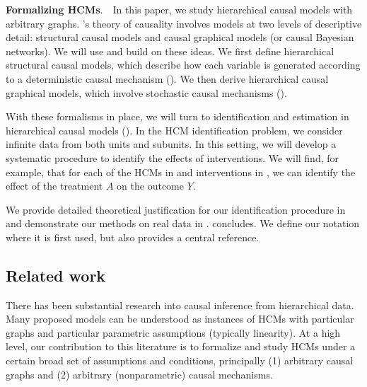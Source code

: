 \documentclass[12pt]{article}
\newcommand{\parhead}[1]{\vspace{0.1in} \noindent \textbf{#1}. \,\,}
\begin{document}
\parhead{Formalizing HCMs} In this paper, we study hierarchical causal models with arbitrary graphs. \citet{Pearl2009-fh}'s theory of causality involves models at two levels of descriptive detail: structural causal models and causal graphical models (or causal Bayesian networks). We will use and build on these ideas.  We first define hierarchical structural causal models, which describe how each variable is generated according to a deterministic causal mechanism (). We then derive hierarchical causal graphical models, which involve stochastic causal mechanisms ().

With these formalisms in place, we will turn to identification and estimation in hierarchical causal models (). In the HCM identification problem, we consider infinite data from both units and subunits. In this setting, we will develop a systematic procedure to identify the effects of interventions.  We will find, for example, that for each of the HCMs in  and interventions in , we can identify the effect of the treatment $A$ on the outcome $Y$.

We provide detailed theoretical justification for our identification procedure in  and demonstrate our methods on real data in .  concludes.
We define our notation where it is first used, but  also provides a central reference.

 \subsection{Related work} \label{sec:related_work}

There has been substantial research into causal inference from
hierarchical data. Many proposed models can be understood as
instances of HCMs with particular graphs and particular parametric
assumptions (typically linearity). At a high level, our contribution
to this literature is to formalize and study HCMs under a certain
broad set of assumptions and conditions, principally (1) arbitrary causal
graphs and (2) arbitrary (nonparametric) causal mechanisms.
\end{document}
